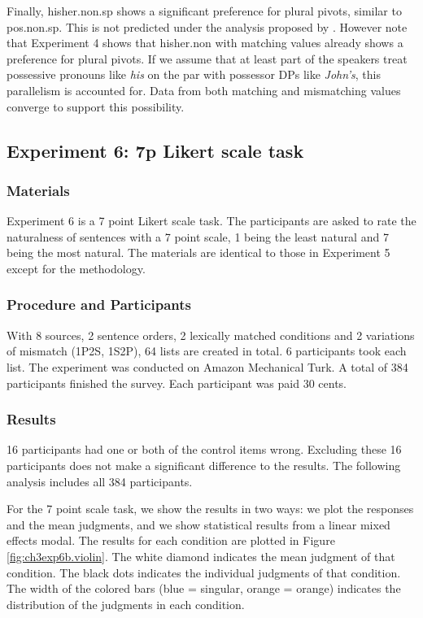 \documentclass[
  11pt          %
  ,letterpaper  %
  ,center       %
  ,noupper      %
  ]{uconnthesis2}
\begin{document}
Finally, hisher.non.sp shows a significant preference for plural pivots, similar to pos.non.sp. This is not predicted under the analysis proposed by \cite{Shen:ip2}. However note that Experiment 4 shows that hisher.non with matching values already shows a preference for plural pivots. If we assume that at least part of the speakers treat possessive pronouns like \textit{his} on the par with possessor DPs like \textit{John's}, this parallelism is accounted for. Data from both matching and mismatching values converge to support this possibility. 

\subsection{Experiment 6: 7p Likert scale task}

\subsubsection{Materials}

Experiment 6 is a 7 point Likert scale task. The participants are asked to rate the naturalness of sentences with a 7 point scale, 1 being the least natural and 7 being the most natural. The materials are identical to those in Experiment 5 except for the methodology.

\subsubsection{Procedure and Participants}

With 8 sources, 2 sentence orders, 2 lexically matched conditions and 2 variations of mismatch (1P2S, 1S2P), 64 lists are created in total. 6 participants took each list. The experiment was conducted on Amazon Mechanical Turk. A total of 384 participants finished the survey. Each participant was paid 30 cents. 

\subsubsection{Results}

16 participants had one or both of the control items wrong. Excluding these 16 participants does not make a significant difference to the results. The following analysis includes all 384 participants.

For the 7 point scale task, we show the results in two ways: we plot the responses and the mean judgments, and we show statistical results from a linear mixed effects modal. The results for each condition are plotted in Figure \ref{fig:ch3exp6b.violin}. The white diamond indicates the mean judgment of that condition. The black dots indicates the individual judgments of that condition. The width of the colored bars (blue = singular, orange = orange) indicates the distribution of the judgments in each condition.
\end{document}
